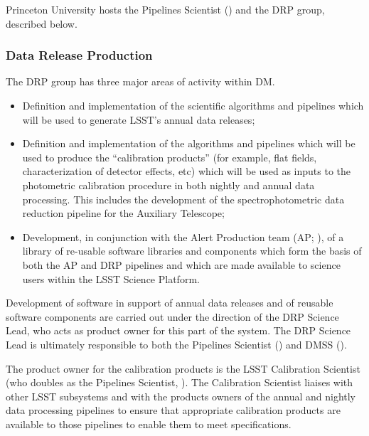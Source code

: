 Princeton University hosts the Pipelines Scientist () and the \gls{DRP} group, described below.

\subsubsection{Data Release Production \label{sect:drp}}

The \gls{DRP} group has three major areas of activity within \gls{DM}.

\begin{itemize}

  \item{Definition and implementation of the scientific algorithms and pipelines which will be used to generate \gls{LSST}'s annual data releases;}

  \item{Definition and implementation of the algorithms and pipelines which will be used to produce the ``calibration products'' (for example, flat fields, characterization of detector effects, etc) which will be used as inputs to the photometric \gls{calibration} procedure in both nightly and annual data processing. This includes the development of the spectrophotometric data reduction \gls{pipeline} for the Auxiliary Telescope;}

  \item{Development, in conjunction with the \gls{Alert Production} team (\gls{AP}; ), of a library of re-usable software libraries and components which form the basis of both the \gls{AP} and \gls{DRP} pipelines and which are made available to science users within the \gls{LSST} \gls{Science Platform}.}

\end{itemize}

Development of software in support of annual data releases and of reusable software components are carried out under the direction of the \gls{DRP} Science Lead, who acts as product owner for this part of the system.
The \gls{DRP} Science Lead is ultimately responsible to both the Pipelines Scientist () and \gls{DMSS} ().

The product owner for the \gls{calibration} products is the \gls{LSST} \gls{Calibration Scientist} (who doubles as the Pipelines Scientist, ).
The \gls{Calibration Scientist} liaises with other \gls{LSST} subsystems and with the products owners of the annual and nightly data processing pipelines to ensure that appropriate \gls{calibration} products are available to those pipelines to enable them to meet specifications.

